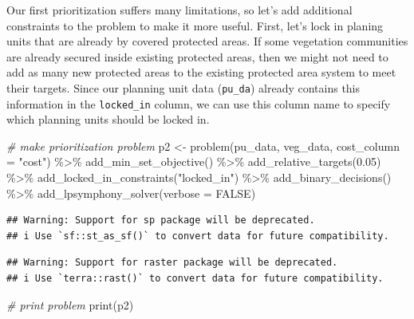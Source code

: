 \documentclass[
  12pt,
]{book}
\newenvironment{Shaded}{\begin{snugshade}}{\end{snugshade}}
\newcommand{\AttributeTok}[1]{\textcolor[rgb]{0.77,0.63,0.00}{#1}}
\newcommand{\CommentTok}[1]{\textcolor[rgb]{0.56,0.35,0.01}{\textit{#1}}}
\newcommand{\ConstantTok}[1]{\textcolor[rgb]{0.00,0.00,0.00}{#1}}
\newcommand{\FloatTok}[1]{\textcolor[rgb]{0.00,0.00,0.81}{#1}}
\newcommand{\FunctionTok}[1]{\textcolor[rgb]{0.00,0.00,0.00}{#1}}
\newcommand{\NormalTok}[1]{#1}
\newcommand{\OtherTok}[1]{\textcolor[rgb]{0.56,0.35,0.01}{#1}}
\newcommand{\SpecialCharTok}[1]{\textcolor[rgb]{0.00,0.00,0.00}{#1}}
\newcommand{\StringTok}[1]{\textcolor[rgb]{0.31,0.60,0.02}{#1}}
\begin{document}
Our first prioritization suffers many limitations, so let's add additional constraints to the problem to make it more useful. First, let's lock in planing units that are already by covered protected areas. If some vegetation communities are already secured inside existing protected areas, then we might not need to add as many new protected areas to the existing protected area system to meet their targets. Since our planning unit data (\texttt{pu\_da}) already contains this information in the \texttt{locked\_in} column, we can use this column name to specify which planning units should be locked in.

\begin{Shaded}
\begin{Highlighting}[]
\CommentTok{\# make prioritization problem}
\NormalTok{p2 }\OtherTok{\textless{}{-}} \FunctionTok{problem}\NormalTok{(pu\_data, veg\_data, }\AttributeTok{cost\_column =} \StringTok{"cost"}\NormalTok{) }\SpecialCharTok{\%\textgreater{}\%}
      \FunctionTok{add\_min\_set\_objective}\NormalTok{() }\SpecialCharTok{\%\textgreater{}\%}
      \FunctionTok{add\_relative\_targets}\NormalTok{(}\FloatTok{0.05}\NormalTok{) }\SpecialCharTok{\%\textgreater{}\%}
      \FunctionTok{add\_locked\_in\_constraints}\NormalTok{(}\StringTok{"locked\_in"}\NormalTok{) }\SpecialCharTok{\%\textgreater{}\%}
      \FunctionTok{add\_binary\_decisions}\NormalTok{() }\SpecialCharTok{\%\textgreater{}\%}
      \FunctionTok{add\_lpsymphony\_solver}\NormalTok{(}\AttributeTok{verbose =} \ConstantTok{FALSE}\NormalTok{)}
\end{Highlighting}
\end{Shaded}

\begin{verbatim}
## Warning: Support for sp package will be deprecated.
## i Use `sf::st_as_sf()` to convert data for future compatibility.
\end{verbatim}

\begin{verbatim}
## Warning: Support for raster package will be deprecated.
## i Use `terra::rast()` to convert data for future compatibility.
\end{verbatim}

\begin{Shaded}
\begin{Highlighting}[]
\CommentTok{\# print problem}
\FunctionTok{print}\NormalTok{(p2)}
\end{Highlighting}
\end{Shaded}
\end{document}
